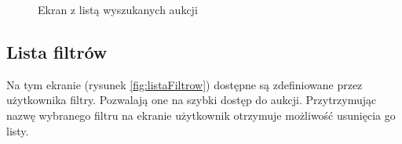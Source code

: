 \documentclass[a4paper,twoside,titlepage,openright]{book}
\begin{document}
\begin{figure}[h]
\begin{minipage}[t]{0.3\textwidth}
		\caption{Ekran z listą wyszukanych aukcji}
		\label{fig:listaWyszukanych}
	\end{minipage}
\vspace*{-0.25cm}
\end{figure}


\subsection{Lista filtrów}
Na tym ekranie (rysunek \ref{fig:listaFiltrow}) dostępne są zdefiniowane przez użytkownika filtry. Pozwalają one na szybki dostęp do aukcji. Przytrzymując nazwę wybranego filtru na ekranie użytkownik otrzymuje możliwość usunięcia go listy.
\end{document}

